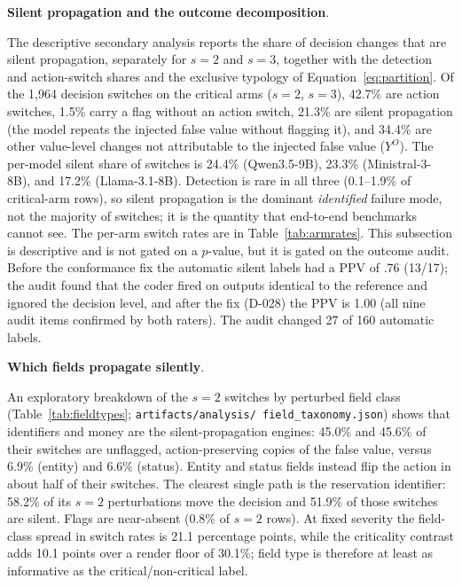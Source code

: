 \documentclass[a4paper,fleqn]{cas-sc}
\begin{document}
\noindent\textbf{Silent propagation and the outcome decomposition}.\

The descriptive secondary analysis reports the share of decision changes that are silent
propagation, separately for $s=2$ and $s=3$, together with the detection and action-switch shares
and the exclusive typology of Equation~\ref{eq:partition}. Of the 1{,}964 decision switches on the
critical arms ($s=2$, $s=3$), 42.7\% are action switches, 1.5\% carry a flag without an action
switch, 21.3\% are silent propagation (the model repeats the injected false value without flagging
it), and 34.4\% are other value-level changes not attributable to the injected false value
($Y^{O}$). The per-model silent share of switches is 24.4\% (Qwen3.5-9B), 23.3\%
(Ministral-3-8B), and 17.2\% (Llama-3.1-8B). Detection is rare in all three (0.1--1.9\% of
critical-arm rows), so silent propagation is the dominant \emph{identified} failure mode, not the
majority of switches; it is the quantity that end-to-end benchmarks cannot see.
The per-arm switch rates are in Table~\ref{tab:armrates}. This subsection is descriptive and is
not gated on a $p$-value, but it is gated on the outcome audit. Before the conformance fix the
automatic silent labels had a PPV of .76 (13/17); the audit found that the coder fired on outputs
identical to the reference and ignored the decision level, and after the fix (D-028) the PPV is
1.00 (all nine audit items confirmed by both raters). The audit changed 27 of 160 automatic
labels.

\noindent\textbf{Which fields propagate silently}.\

An exploratory breakdown of the $s=2$ switches by perturbed field class
(Table~\ref{tab:fieldtypes}; \texttt{artifacts/\allowbreak analysis/\allowbreak
field\_taxonomy.json}) shows that identifiers and money are the silent-propagation engines: 45.0\% and 45.6\% of their switches are
unflagged, action-preserving copies of the false value, versus 6.9\% (entity) and 6.6\% (status).
Entity and status fields instead flip the action in about half of their switches. The clearest
single path is the reservation identifier: 58.2\% of its $s=2$ perturbations move the decision and
51.9\% of those switches are silent. Flags are near-absent (0.8\% of $s=2$ rows). At fixed
severity the field-class spread in switch rates is 21.1 percentage points, while the criticality
contrast adds 10.1 points over a render floor of 30.1\%; field type is therefore at least as
informative as the critical/non-critical label.
\end{document}
